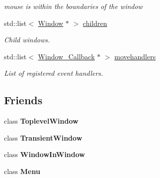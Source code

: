 \begin{DoxyCompactItemize}
\begin{DoxyCompactList}\small\item\em {\ttfamily mouse} is within the boundaries of the window \end{DoxyCompactList}\item 
std\-::list$<$ \hyperlink{classGUI_1_1Window}{Window} $\ast$ $>$ \hyperlink{classGUI_1_1Window_ac10e617306be4367ed164ea97f5d3132}{children}
\begin{DoxyCompactList}\small\item\em Child windows. \end{DoxyCompactList}\item 
\hypertarget{classGUI_1_1Window_a5dc78efd55a14098437cc25597c21bef}{std\-::list$<$ \hyperlink{structGUI_1_1Window__Callback}{Window\-\_\-\-Callback} $\ast$ $>$ \hyperlink{classGUI_1_1Window_a5dc78efd55a14098437cc25597c21bef}{movehandlers}}\label{classGUI_1_1Window_a5dc78efd55a14098437cc25597c21bef}

\begin{DoxyCompactList}\small\item\em List of registered event handlers. \end{DoxyCompactList}\end{DoxyCompactItemize}
\subsection*{Friends}
\begin{DoxyCompactItemize}
\item 
\hypertarget{classGUI_1_1Window_a47359b01fb4f622a9770ab8b22d75a63}{class {\bfseries Toplevel\-Window}}\label{classGUI_1_1Window_a47359b01fb4f622a9770ab8b22d75a63}

\item 
\hypertarget{classGUI_1_1Window_ac4d9da9cc48d502966fd1039d5ea85fa}{class {\bfseries Transient\-Window}}\label{classGUI_1_1Window_ac4d9da9cc48d502966fd1039d5ea85fa}

\item 
\hypertarget{classGUI_1_1Window_a577e02e0bc370cbb39229fc67b6ff829}{class {\bfseries Window\-In\-Window}}\label{classGUI_1_1Window_a577e02e0bc370cbb39229fc67b6ff829}

\item 
\hypertarget{classGUI_1_1Window_a834cec0fab7efabab3cd53540e4d466d}{class {\bfseries Menu}}\label{classGUI_1_1Window_a834cec0fab7efabab3cd53540e4d466d}

\end{DoxyCompactItemize}


